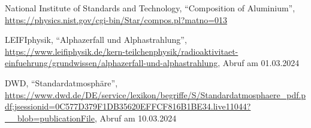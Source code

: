 \documentclass[12pt,a4paper]{scrartcl}
\numberwithin{equation}{section} %
\begin{document}
\begin{thebibliography}{99}
	National Institute of Standards and Technology, ``Composition of  Aluminium'',
	\url{https://physics.nist.gov/cgi-bin/Star/compos.pl?matno=013}

	LEIFIphysik, ``Alphazerfall und Alphastrahlung'',
	\url{https://www.leifiphysik.de/kern-teilchenphysik/radioaktivitaet-einfuehrung/grundwissen/alphazerfall-und-alphastrahlung},
	Abruf am 01.03.2024

	DWD, ``Standardatmosphäre'',
	\url{https://www.dwd.de/DE/service/lexikon/begriffe/S/Standardatmosphaere_pdf.pdf;jsessionid=0C577D379F1DB35620EFFCF816B1BE34.live11044?__blob=publicationFile}, Abruf am 10.03.2024

\end{thebibliography}
\end{document}
